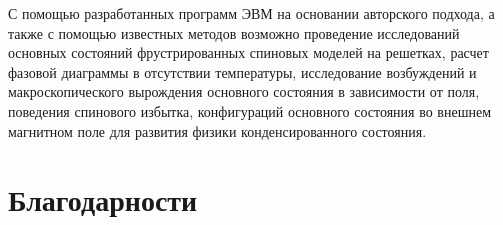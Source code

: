 \documentclass[utf8, babel, sor, jor, amsmath, amssymb, reprint]{elsarticle} %
\begin{document}
С помощью разработанных программ ЭВМ на основании авторского подхода, а также с помощью известных методов возможно проведение исследований основных состояний фрустрированных спиновых моделей на решетках, расчет фазовой диаграммы в отсутствии температуры, исследование возбуждений и макроскопического вырождения основного состояния в зависимости от поля, поведения спинового избытка, конфигураций основного состояния во внешнем магнитном поле для развития физики конденсированного состояния.


\section{Благодарности}

 


\end{document}
